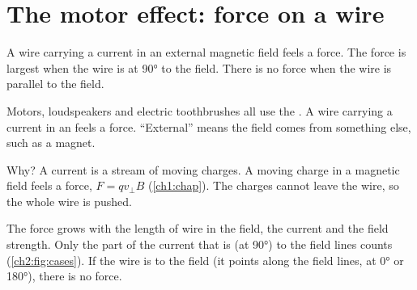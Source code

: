 \section{The motor effect: force on a wire}\label{ch2:sec:motor}

\begin{bigidea}
A wire carrying a current in an external magnetic field feels a force. The force is largest when
the wire is at \ang{90} to the field. There is no force when the wire is parallel to the field.
\end{bigidea}

\begin{keywords}
\end{keywords}

Motors, loudspeakers and electric toothbrushes all use the . A wire carrying a
current in an  feels a force. ``External'' means the field comes
from something else, such as a magnet.

Why? A current is a stream of moving charges. A moving charge in a magnetic field feels a force,
$F = qv_\perp B$ (\cref{ch1:chap}). The charges cannot leave the wire, so the whole wire is pushed.

The force grows with the length of wire in the field, the current and the field strength. Only the
part of the current that is  (at \ang{90}) to the field lines counts
(\cref{ch2:fig:cases}). If the wire is  to the field (it points along the field
lines, at \ang{0} or \ang{180}), there is no force.

